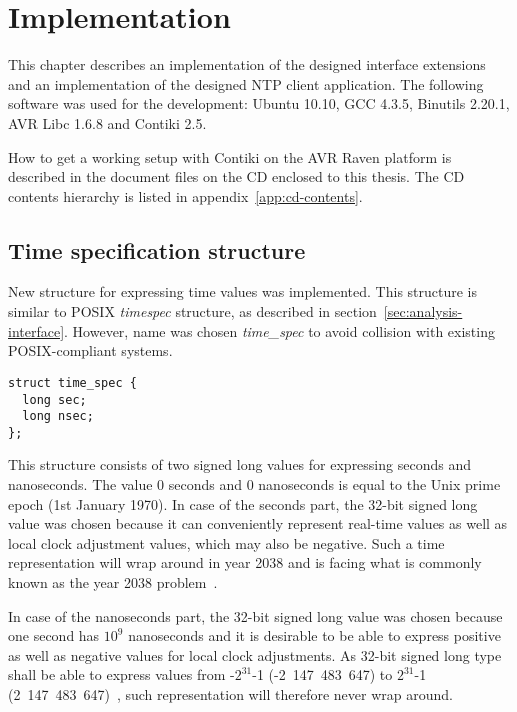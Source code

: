 
\chapter{Implementation}
This chapter describes an implementation of the designed interface extensions
and an implementation of the designed NTP client application.
The following software was used for the development:
Ubuntu 10.10, GCC 4.3.5, Binutils 2.20.1, AVR Libc 1.6.8 and Contiki 2.5.

How to get a working setup with Contiki on the AVR Raven platform is described in
the document files on the CD enclosed to this thesis.
The CD contents hierarchy is listed in appendix~\ref{app:cd-contents}.


\section{Time specification structure}
New structure for expressing time values was implemented.
This structure is similar to POSIX {\it{timespec}} structure,
as described in section~\ref{sec:analysis-interface}.
However, name was chosen {\it{time\_spec}} to avoid collision with
existing POSIX-compliant systems.
\begin{lstlisting}
struct time_spec {
  long sec;
  long nsec;
};
\end{lstlisting}
This structure consists of two signed long values for expressing seconds and nanoseconds.
The value 0 seconds and 0 nanoseconds is equal to the Unix prime epoch (1st January 1970).
In case of the seconds part, the 32-bit signed long value was chosen because
it can conveniently
represent real-time values as well as local clock adjustment values, which may also be negative.
Such a time representation will wrap around in year 2038 and is facing
what is commonly known as the year 2038 problem~\cite{posix}.

In case of the nanoseconds part, the 32-bit signed long value was chosen because
one second has $10^9$ nanoseconds and it is
desirable to be able to express positive as well as negative values for local clock adjustments.
As 32-bit signed long type shall be able to express values from -$2^{31}$-1 (-2~147~483~647)
to $2^{31}$-1 (2~147~483~647)~\cite{c99},
such representation will therefore never wrap around.

